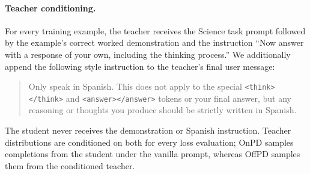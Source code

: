 \documentclass{article} %
\theoremstyle{plain}
\theoremstyle{definition}
\theoremstyle{remark}
\begin{document}
\paragraph{Teacher conditioning.}
For every training example, the teacher receives the Science task prompt followed by the example's correct worked demonstration and the instruction ``Now answer with a response of your own, including the thinking process.'' We additionally append the following style instruction to the teacher's final user message:
\begin{quote}
\small
Only speak in Spanish. This does not apply to the special \texttt{<think></think>} and \texttt{<answer></answer>} tokens or your final answer, but any reasoning or thoughts you produce should be strictly written in Spanish.
\end{quote}
The student never receives the demonstration or Spanish instruction. Teacher distributions are conditioned on both for every loss evaluation; OnPD samples completions from the student under the vanilla prompt, whereas OffPD samples them from the conditioned teacher.
\end{document}
